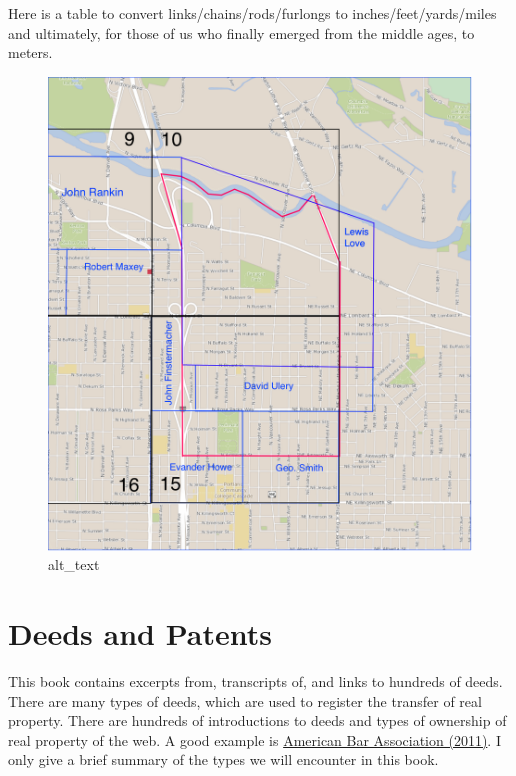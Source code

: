 \documentclass[
  12pt,
]{book}
\begin{document}
Here is a table to convert links/chains/rods/furlongs to inches/feet/yards/miles and ultimately, for those of us who finally emerged from the middle ages, to meters.

\begin{figure}
\centering
\includegraphics{images/02_images/image5.png}
\caption{alt\_text}
\end{figure}

\hypertarget{deeds-and-patents}{%
\section{Deeds and Patents}\label{deeds-and-patents}}

This book contains excerpts from, transcripts of, and links to hundreds of deeds. There are many types of deeds, which are used to register the transfer of real property. There are hundreds of introductions to deeds and types of ownership of real property of the web. A good example is \href{https://www.americanbar.org/newsletter/publications/law_trends_news_practice_area_e_newsletter_home/2011_summer/real_property_interests_deeds.html}{American Bar Association (2011)}. I only give a brief summary of the types we will encounter in this book.
\end{document}

